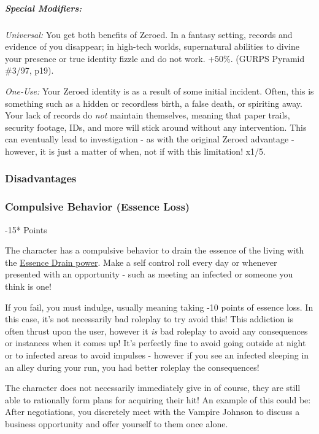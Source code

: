\begin{multicols*}{3}
	\subparagraph{Special Modifiers:}
	
	\textit{Universal:} You get both benefits of Zeroed. In a fantasy setting, records and evidence of you disappear; in high-tech worlds, supernatural abilities to divine your presence or true identity fizzle and do not work. +50\%. (GURPS Pyramid \#3/97, p19). 
	
	\textit{One-Use:} Your Zeroed identity is as a result of some initial incident. Often, this is something such as a hidden or recordless birth, a false death, or spiriting away. Your lack of records do \textit{not} maintain themselves, meaning that paper trails, security footage, IDs, and more will stick around without any intervention. This can eventually lead to investigation - as with the original Zeroed advantage - however, it is just a matter of when, not if with this limitation! x1/5.
	
	\subsubsection{Disadvantages}
	
	\subsubsection*{Compulsive Behavior (Essence Loss)}
	\begin{flushright}
		-15* Points
	\end{flushright}
	
	The character has a compulsive behavior to drain the essence of the living with the \hyperref[essence_drain]{Essence Drain power}. Make a self control roll every day or whenever presented with an opportunity - such as meeting an infected or someone you think is one!
	
	If you fail, you must indulge, usually meaning taking -10 points of essence loss. In this case, it's not necessarily bad roleplay to try avoid this! This addiction is often thrust upon the user, however it \textit{is} bad roleplay to avoid any consequences or instances when it comes up! It's perfectly fine to avoid going outside at night or to infected areas to avoid impulses - however if you see an infected sleeping in an alley during your run, you had better roleplay the consequences!
	
	The character does not necessarily immediately give in of course, they are still able to rationally form plans for acquiring their hit! An example of this could be: After negotiations, you discretely meet with the Vampire Johnson to discuss a business opportunity and offer yourself to them once alone.
	

\end{multicols*}
